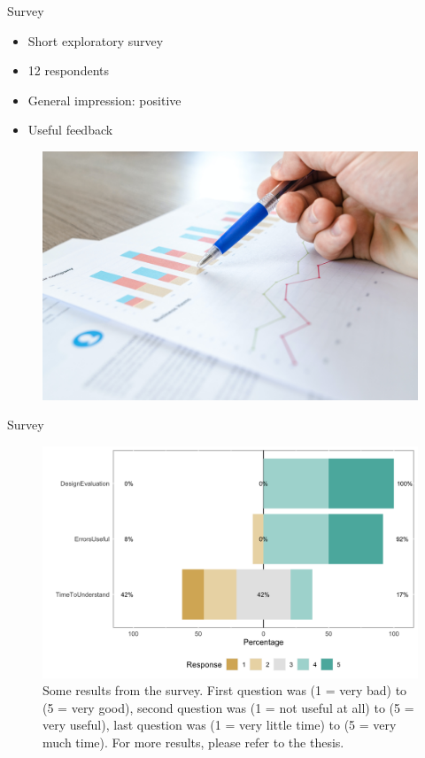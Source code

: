\documentclass[aspectratio=169]{beamer}
\begin{document}
\begin{frame}[c]{Survey}
    \begin{multicols}{2}
        \begin{itemize}
            \item<1-> Short exploratory survey
            \item<2-> 12 respondents
            \item<3-> General impression: positive
            \item<4-> Useful feedback
        \end{itemize}
        \columnbreak
        \begin{figure}
            \centering
            \includegraphics[width=\linewidth]{survey.jpg}
        \end{figure}
    \end{multicols}
\end{frame}
\begin{frame}[c]{Survey}
    \begin{figure}
        \centering
        \includegraphics[width=.7\linewidth]{results.png}
        \caption*{
            \scriptsize Some results from the survey. First question was (1 = very bad) to (5 = very good), second 
            question was (1 = not useful at all) to (5 = very useful), last question was (1 = very little time) to 
            (5 = very much time). For more results, please refer to the thesis.
        }
    \end{figure}
\end{frame}
\end{document}
